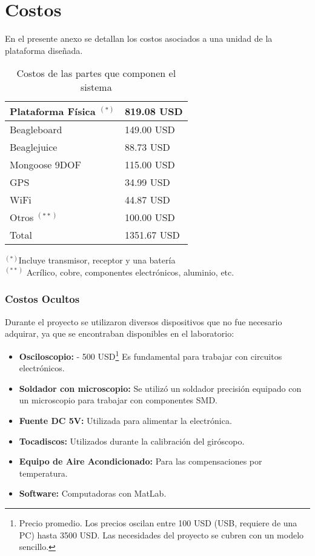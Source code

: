 \documentclass[main]{subfiles}
\begin{document}
\chapter{Costos}
\label{chap:anexo_costos}
En el presente anexo se detallan los costos asociados a una unidad de la plataforma dise\~nada. 

\begin{table}[H]
\begin{center}
\begin{tabular}{|p{5cm}|p{3cm}|}
\hline
Plataforma F\'isica $^{(*)}$  & 819.08 USD  \\
\hline
Beagleboard & 149.00 USD \\
\hline
Beaglejuice & 88.73 USD\\
\hline 
Mongoose 9DOF & 115.00 USD\\
\hline
GPS & 34.99 USD\\
\hline
WiFi & 44.87 USD\\
\hline
Otros $^{(**)}$ & 100.00 USD\\
\hline
Total & 1351.67 USD \\
\hline
\end{tabular}
\label{tab:acc-anexo}
\end{center}
\begin{center}
$^{(*)}$Incluye transmisor, receptor y una bater\'ia\\
$^{(**)}$ Acr\'ilico, cobre, componentes electr\'onicos, aluminio, etc.
\end{center}
\caption{Costos de las partes que componen el sistema}
\end{table}

\subsection{Costos Ocultos}
\label{sec:anexo_costos-costos-ocultos}

Durante el proyecto se utilizaron diversos dispositivos que no fue necesario adquirar, ya que se encontraban disponibles en el laboratorio:

\begin{itemize}
\item \textbf{Osciloscopio:} - 500 USD\footnote{Precio promedio. Los precios oscilan entre 100 USD (USB, requiere de una PC) hasta 3500 USD. Las necesidades del proyecto se cubren con un modelo sencillo.} Es fundamental para trabajar con circuitos electrónicos.
\item \textbf{Soldador con microscopio:} Se utilizó un soldador precisión equipado con un microscopio para trabajar con componentes SMD.
\item \textbf{Fuente DC 5V:} Utilizada para alimentar la electrónica.
\item \textbf{Tocadiscos:} Utilizados durante la calibración del giróscopo.
\item \textbf{Equipo de Aire Acondicionado:} Para las compensaciones por temperatura.
\item \textbf{Software:} Computadoras con MatLab.
\end{itemize}
\end{document}

